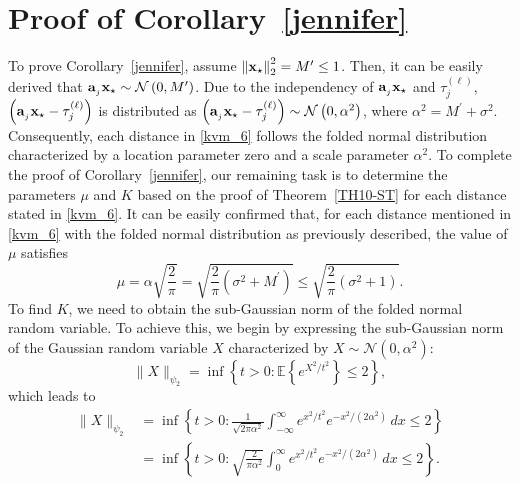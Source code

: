 \documentclass[12pt,draftcls,onecolumn]{IEEEtran}
\begin{document}
\section{Proof of Corollary~\ref{jennifer}}
\label{A6}
To prove Corollary~\ref{jennifer},
assume $\left\|\mathbf{x}_{\star}\right\|^{2}_{2}=M^{\prime}\leq 1$. Then, it can be easily derived that $\mathbf{a}_{_{j}}\mathbf{x}_{\star}\sim\mathcal{N}\left(0,M^{\prime}\right)$. Due to the independency of $\mathbf{a}_{_{j}}\mathbf{x}_{\star}$ and $\tau_{j}^{(\ell)}$, $\left(\mathbf{a}_{_{j}}\mathbf{x}_{\star}-\tau^{(\ell)}_{j}\right)$ is distributed as $\left(\mathbf{a}_{_{j}}\mathbf{x}_{\star}-\tau^{(\ell)}_{j}\right)\sim\mathcal{N}\left(0,\alpha^2\right)$, where $\alpha^2=M^{\prime}+\sigma^2$. Consequently, each distance in \eqref{kvm_6} follows the folded normal distribution characterized by a location parameter zero and a scale parameter $\alpha^2$. To complete the proof of Corollary~\ref{jennifer}, our remaining task is to determine the parameters $\mu$ and $K$ based on the proof of Theorem~\ref{TH10-ST} for each distance stated in \eqref{kvm_6}. 
It can be easily confirmed that, for each distance mentioned in \eqref{kvm_6} with the folded normal distribution as previously described, the value of $\mu$ satisfies
\begin{equation}
\label{A6_2}
\mu=\alpha\sqrt{\frac{2}{\pi}}=\sqrt{\frac{2}{\pi}\left(\sigma^2+M^{\prime}\right)}\leq\sqrt{\frac{2}{\pi}\left(\sigma^2+1\right)}.
\end{equation}
To find $K$, we need to obtain 
the sub-Gaussian norm of the folded normal random variable. To achieve this, we begin by expressing the sub-Gaussian norm of the Gaussian random variable $X$ characterized by $X\sim\mathcal{N}\left(0,\alpha^2\right)$:
\begin{equation}
\label{A6_3}
\|X\|_{\psi_2}=\inf \left\{t>0: \mathbb{E}\left\{e^{X^2/t^2}\right\} \leq 2\right\},
\end{equation}
which leads to
\begin{equation}
\label{A6_4}
\begin{aligned}
\|X\|_{\psi_2}&=\inf \left\{t>0: \frac{1}{\sqrt{2\pi\alpha^2}}\int_{-\infty}^{\infty}e^{x^2/t^2}e^{-x^2/(2\alpha^2)}\,dx\leq 2\right\}\\&=\inf \left\{t>0: \sqrt{\frac{2}{\pi\alpha^2}}\int_{0}^{\infty}e^{x^2/t^2}e^{-x^2/(2\alpha^2)}\,dx\leq 2\right\}.
\end{aligned}
\end{equation}
\end{document}
